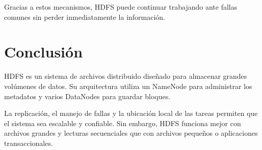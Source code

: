 Gracias a estos mecanismos, HDFS puede continuar trabajando ante fallas
comunes sin perder inmediatamente la información.

\section{Conclusión}

HDFS es un sistema de archivos distribuido diseñado para almacenar grandes
volúmenes de datos. Su arquitectura utiliza un NameNode para administrar los
metadatos y varios DataNodes para guardar bloques.

La replicación, el manejo de fallas y la ubicación local de las tareas permiten
que el sistema sea escalable y confiable. Sin embargo, HDFS funciona mejor con
archivos grandes y lecturas secuenciales que con archivos pequeños o
aplicaciones transaccionales.